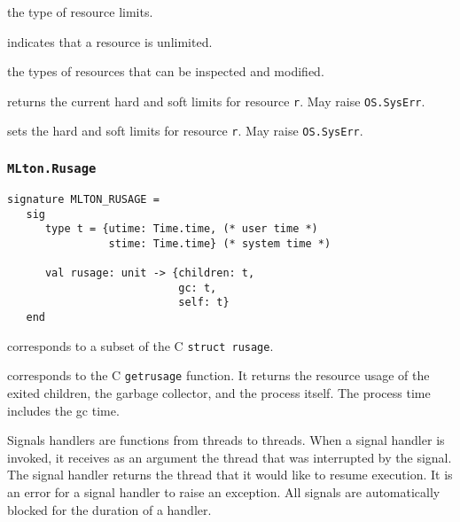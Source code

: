 \begin{description}
the type of resource limits.

indicates that a resource is unlimited.

the types of resources that can be inspected and modified.

returns the current hard and soft limits for resource {\tt r}. May
raise {\tt OS.SysErr}.

sets the hard and soft limits for resource {\tt r}.  May raise {\tt OS.SysErr}.
\end{description}

\subsubsection{\tt MLton.Rusage}
\begin{verbatim}
signature MLTON_RUSAGE =
   sig
      type t = {utime: Time.time, (* user time *)
                stime: Time.time} (* system time *)
         
      val rusage: unit -> {children: t,
                           gc: t,
                           self: t}
   end
\end{verbatim}

\begin{description}
corresponds to a subset of the C {\tt struct rusage}.

corresponds to the C {\tt getrusage} function.  It returns the resource usage of
the exited children, the garbage collector, and the process itself.  The process
time includes the gc time.
\end{description}

Signals handlers are functions from threads to threads.  When a signal 
handler is invoked, it receives as an argument the thread that was
interrupted by the signal.  The signal handler returns the thread that 
it would like to resume execution.  It is an error for a signal
handler to raise an exception.  All signals are automatically blocked
for the duration of a handler.

